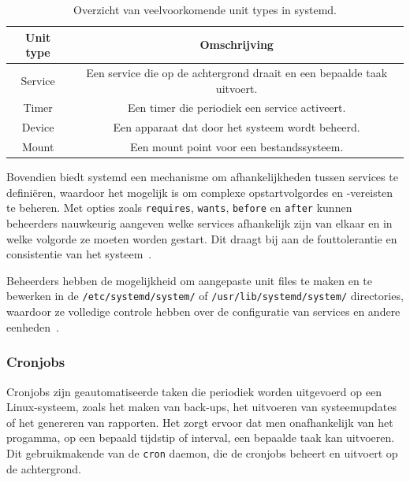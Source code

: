 \begin{table}[!h]
    \begin{center}
        \begin{tabular}{ c c }
            \hline
                Unit type & Omschrijving \\ [0.5ex] 
            \hline
                Service & Een service die op de achtergrond draait en een bepaalde taak uitvoert. \\
                Timer   & Een timer die periodiek een service activeert. \\
                Device  & Een apparaat dat door het systeem wordt beheerd. \\
                Mount   & Een mount point voor een bestandssysteem. \\
        \end{tabular}
    \end{center}
    \caption[Veelvoorkomende unit types in systemd.]{Overzicht van veelvoorkomende unit types in systemd.}
    \label{table:sytemd_unit_types}
\end{table}

Bovendien biedt systemd een mechanisme om afhankelijkheden tussen services te definiëren, waardoor het mogelijk is om complexe opstartvolgordes en -vereisten te beheren.
Met opties zoals \texttt{requires}, \texttt{wants}, \texttt{before} en \texttt{after} kunnen beheerders nauwkeurig aangeven welke services afhankelijk zijn van elkaar en in welke volgorde ze moeten worden gestart.
Dit draagt bij aan de fouttolerantie en consistentie van het systeem~\autocite{ward2021linux}.

Beheerders hebben de mogelijkheid om aangepaste unit files te maken en te bewerken in de \texttt{/etc/systemd/system/} of \texttt{/usr/lib/systemd/system/} directories, waardoor ze volledige controle hebben over de configuratie van services en andere eenheden~\autocite{ward2021linux}.

\subsubsection{Cronjobs}
\label{linux_cronjobs}

Cronjobs zijn geautomatiseerde taken die periodiek worden uitgevoerd op een Linux-systeem, zoals het maken van back-ups, het uitvoeren van systeemupdates of het genereren van rapporten.
Het zorgt ervoor dat men onafhankelijk van het progamma, op een bepaald tijdstip of interval, een bepaalde taak kan uitvoeren.
Dit gebruikmakende van de \texttt{cron} daemon, die de cronjobs beheert en uitvoert op de achtergrond.

